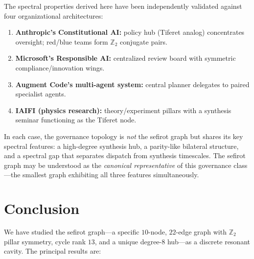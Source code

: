 \documentclass[11pt,a4paper]{amsart}
\theoremstyle{remark}
\newcommand{\bbZ}{\mathbb{Z}}
\begin{document}
The spectral properties derived here have been independently validated
against four organizational architectures:
\begin{enumerate}[leftmargin=*,label=\arabic*.]
\item \textbf{Anthropic's Constitutional AI:} policy hub (Tiferet analog)
  concentrates oversight; red/blue teams form $\bbZ_2$ conjugate pairs.
\item \textbf{Microsoft's Responsible AI:} centralized review board with
  symmetric compliance/innovation wings.
\item \textbf{Augment Code's multi-agent system:} central planner delegates
  to paired specialist agents.
\item \textbf{IAIFI (physics research):} theory/experiment pillars with a
  synthesis seminar functioning as the Tiferet node.
\end{enumerate}

In each case, the governance topology is \emph{not} the sefirot graph but
shares its key spectral features: a high-degree synthesis hub, a
parity-like bilateral structure, and a spectral gap that separates dispatch
from synthesis timescales. The sefirot graph may be understood as the
\emph{canonical representative} of this governance class---the smallest
graph exhibiting all three features simultaneously.

\section{Conclusion}
\label{sec:conclusion}

We have studied the sefirot graph---a specific $10$-node, $22$-edge graph
with $\bbZ_2$ pillar symmetry, cycle rank $13$, and a unique degree-$8$
hub---as a discrete resonant cavity. The principal results are:
\end{document}
